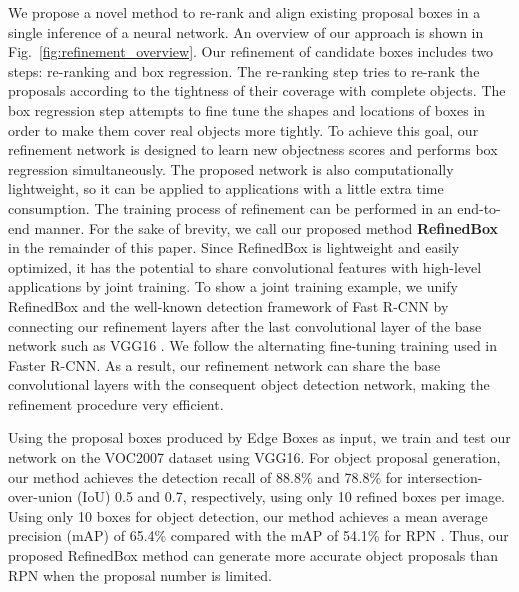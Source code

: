 \documentclass[10pt,twocolumn,letterpaper]{article}
\newcommand{\figref}[1]{Fig.~\ref{#1}}
\begin{document}
We propose a novel method to re-rank and align existing proposal
boxes in a single inference of a neural network.
An overview of our approach is shown in \figref{fig:refinement_overview}.
Our refinement of candidate boxes includes two steps: re-ranking and box regression.
The re-ranking step tries to re-rank the proposals according to the
tightness of their coverage with complete objects.
The box regression step attempts to fine tune the shapes and locations of boxes
in order to make them cover real objects more tightly.
%
To achieve this goal, our refinement network is designed to learn new objectness
scores and performs box regression simultaneously.
The proposed network is also computationally lightweight,
so it can be applied to applications with a little extra time consumption.
The training process of refinement can be performed in an end-to-end manner.
%
For the sake of brevity, we call our proposed method \textbf{RefinedBox} 
in the remainder of this paper.
%
Since RefinedBox is lightweight and easily optimized, it has the potential
to share convolutional features with high-level applications by joint training.
To show a joint training example, we unify RefinedBox and the well-known 
detection framework of Fast R-CNN \cite{girshick2015fast} by connecting our 
refinement layers after the last convolutional layer of the base network
such as VGG16 \cite{simonyan2014very}.
We follow the alternating fine-tuning training used in Faster R-CNN.
As a result, our refinement network can share the base convolutional 
layers with the consequent object detection network, making the refinement 
procedure very efficient.


Using the proposal boxes produced by Edge Boxes \cite{zitnick2014edge} as input,
we train and test our network on the VOC2007 dataset \cite{pascal-voc-2007} using VGG16.
For object proposal generation, our method achieves the detection recall of
88.8\% and 78.8\% for intersection-over-union (IoU) 0.5 and 0.7,
respectively, using only 10 refined boxes per image.
Using only 10 boxes for object detection, our method achieves
a mean average precision (mAP) of 65.4\% compared with the mAP of 54.1\% 
for RPN \cite{ren2015faster}.
Thus, our proposed RefinedBox method can generate more accurate object
proposals than RPN when the proposal number is limited.
\end{document}
